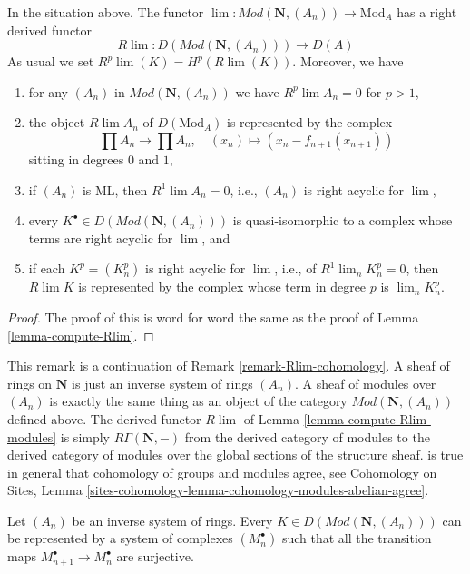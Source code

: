 \begin{lemma}
\label{lemma-compute-Rlim-modules}
In the situation above. The functor
$\lim : \textit{Mod}(\mathbf{N}, (A_n)) \to \text{Mod}_A$
has a right derived functor
$$
R\lim :
D(\textit{Mod}(\mathbf{N}, (A_n)))
\longrightarrow
D(A)
$$
As usual we set $R^p\lim(K) = H^p(R\lim(K))$. Moreover, we have
\begin{enumerate}
\item for any $(A_n)$ in $\textit{Mod}(\mathbf{N}, (A_n))$ we have
$R^p\lim A_n = 0$ for $p > 1$,
\item the object $R\lim A_n$ of $D(\text{Mod}_A)$ is represented
by the complex
$$
\prod A_n \to \prod A_n,\quad (x_n) \mapsto (x_n - f_{n + 1}(x_{n + 1}))
$$
sitting in degrees $0$ and $1$,
\item if $(A_n)$ is ML, then $R^1\lim A_n = 0$, i.e., $(A_n)$
is right acyclic for $\lim$,
\item every $K^\bullet \in D(\textit{Mod}(\mathbf{N}, (A_n)))$
is quasi-isomorphic to a complex whose terms are right acyclic for $\lim$, and
\item if each $K^p = (K^p_n)$ is right acyclic for $\lim$, i.e.,
of $R^1\lim_n K^p_n = 0$, then $R\lim K$ is represented by the
complex whose term in degree $p$ is $\lim_n K_n^p$.
\end{enumerate}
\end{lemma}

\begin{proof}
The proof of this is word for word the same as the proof of
Lemma \ref{lemma-compute-Rlim}.
\end{proof}

\begin{remark}
\label{remark-Rlim-cohomology-modules}
This remark is a continuation of Remark \ref{remark-Rlim-cohomology}.
A sheaf of rings on $\mathbf{N}$ is just an inverse system of rings
$(A_n)$. A sheaf of modules over $(A_n)$ is exactly the same thing
as an object of the category $\textit{Mod}(\mathbf{N}, (A_n))$
defined above. The derived functor $R\lim$ of
Lemma \ref{lemma-compute-Rlim-modules}
is simply $R\Gamma(\mathbf{N}, -)$ from the derived category of
modules to the derived category of modules over the global sections
of the structure sheaf.
is true in general that cohomology of groups and modules agree, see
Cohomology on Sites, Lemma
\ref{sites-cohomology-lemma-cohomology-modules-abelian-agree}.
\end{remark}

\begin{lemma}
\label{lemma-get-ML-system}
Let $(A_n)$ be an inverse system of rings. Every
$K \in D(\textit{Mod}(\mathbf{N}, (A_n)))$
can be represented by a system of complexes $(M_n^\bullet)$
such that all the transition maps $M_{n + 1}^\bullet \to M_n^\bullet$
are surjective.
\end{lemma}

